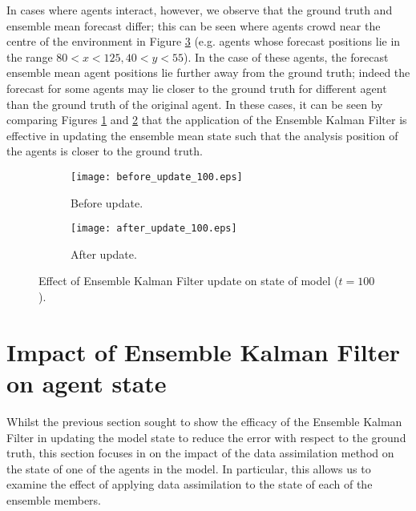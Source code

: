 In cases where agents interact, however, we observe that the ground truth and
ensemble mean forecast differ; this can be seen where agents crowd near the
centre of the environment in Figure \ref{fig:enkf_abm} (e.g. agents whose
forecast positions lie in the range $80<x<125, 40<y<55$).
In the case of these agents, the forecast ensemble mean agent positions lie
further away from the ground truth; indeed the forecast for some agents may lie
closer to the ground truth for different agent than the ground truth of the
original agent. 
In these cases, it can be seen by comparing Figures \ref{fig:abm_before} and
\ref{fig:abm_after} that the application of the Ensemble Kalman Filter is
effective in updating the ensemble mean state such that the analysis position of
the agents is closer to the ground truth.

\begin{figure}[h]
    \centering
    \begin{subfigure}[h]{\textwidth}
        \texttt{[image: before\_update\_100.eps]}
        \caption{Before update.}\label{fig:abm_before}
    \end{subfigure}

    \begin{subfigure}[h]{\textwidth}
        \texttt{[image: after\_update\_100.eps]}
        \caption{After update.}\label{fig:abm_after}
    \end{subfigure}
    \caption[Effect of Ensemle Kalman Filter update on state of model.]{Effect
    of Ensemble Kalman Filter update on state of model
    ($t=100$).}\label{fig:enkf_abm}
\end{figure}

\section{Impact of Ensemble Kalman Filter on agent
state}\label{sec:results:agent}

Whilst the previous section sought to show the efficacy of the Ensemble Kalman
Filter in updating the model state to reduce the error with respect to the
ground truth, this section focuses in on the impact of the data assimilation
method on the state of one of the agents in the model.
In particular, this allows us to examine the effect of applying data
assimilation to the state of each of the ensemble members.

